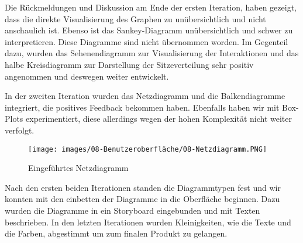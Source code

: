 Die Rückmeldungen und Diskussion am Ende der ersten Iteration, haben gezeigt, dass die direkte Visualisierung des Graphen zu unübersichtlich und nicht anschaulich ist. Ebenso ist das Sankey-Diagramm unübersichtlich und schwer zu interpretieren. Diese Diagramme sind nicht übernommen worden. Im Gegenteil dazu, wurden das Sehenendiagramm zur Visualisierung der Interaktionen und das halbe Kreisdiagramm zur Darstellung der Sitzeverteilung sehr positiv angenommen und deswegen weiter entwickelt.

In der zweiten Iteration wurden das Netzdiagramm und die Balkendiagramme integriert, die positives Feedback bekommen haben. Ebenfalls haben wir mit Box-Plots experimentiert, diese allerdings wegen der hohen Komplexität nicht weiter verfolgt.

\begin{figure}[hbt!]
    \centering
    \texttt{[image: images/08-Benutzeroberfläche/08-Netzdiagramm.PNG]}
    \caption{Eingeführtes Netzdiagramm}
\end{figure}

Nach den ersten beiden Iterationen standen die Diagrammtypen fest und wir konnten mit den einbetten der Diagramme in die Oberfläche beginnen. Dazu wurden die Diagramme in ein Storyboard eingebunden und mit Texten beschrieben. In den letzten Iterationen wurden Kleinigkeiten, wie die Texte und die Farben, abgestimmt um zum finalen Produkt zu gelangen.